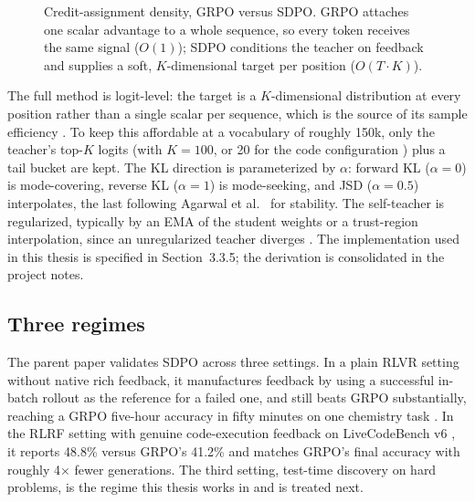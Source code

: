 \documentclass[12pt,a4paper]{report}
\begin{document}
\begin{figure}[H]
\centering
{}
\caption{Credit-assignment density, GRPO versus SDPO. GRPO attaches one scalar advantage to a whole sequence, so every token receives the same signal (\(O(1)\)); SDPO conditions the teacher on feedback and supplies a soft, \(K\)-dimensional target per position (\(O(T\cdot K)\)).}
\label{fig:credit-density}
\end{figure}

The full method is logit-level: the target is a \(K\)-dimensional distribution at every position rather than a single scalar per sequence, which is the source of its sample efficiency \cite{r1}. To keep this affordable at a vocabulary of roughly 150k, only the teacher's top-\(K\) logits (with \(K{=}100\), or 20 for the code configuration \cite{r4}) plus a tail bucket are kept. The KL direction is parameterized by \(\alpha\): forward KL (\(\alpha{=}0\)) is mode-covering, reverse KL (\(\alpha{=}1\)) is mode-seeking, and JSD (\(\alpha{=}0.5\)) interpolates, the last following Agarwal et al.~\cite{r11} for stability. The self-teacher is regularized, typically by an EMA of the student weights or a trust-region interpolation, since an unregularized teacher diverges \cite{r1}. The implementation used in this thesis is specified in Section~3.3.5; the derivation is consolidated in the project notes.

\subsection{Three regimes}\label{three-regimes}

The parent paper validates SDPO across three settings. In a plain RLVR setting without native rich feedback, it manufactures feedback by using a successful in-batch rollout as the reference for a failed one, and still beats GRPO substantially, reaching a GRPO five-hour accuracy in fifty minutes on one chemistry task \cite{r1}. In the RLRF setting with genuine code-execution feedback on LiveCodeBench v6 \cite{r6}, it reports 48.8\% versus GRPO's 41.2\% and matches GRPO's final accuracy with roughly 4× fewer generations. The third setting, test-time discovery on hard problems, is the regime this thesis works in and is treated next.
\end{document}
